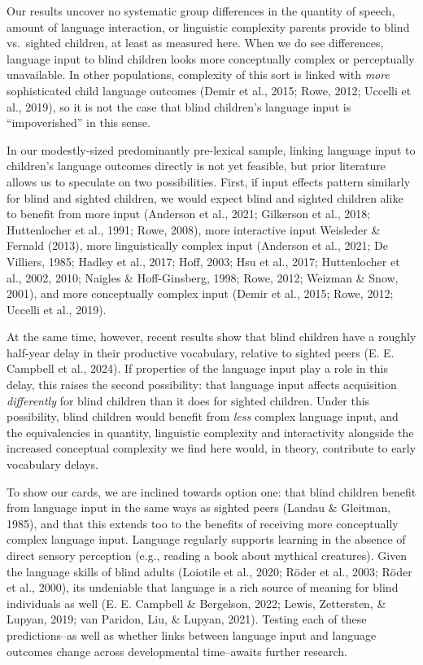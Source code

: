 \documentclass[
  man]{apa6}
\begin{document}
Our results uncover no systematic group differences in the quantity of speech, amount of language interaction, or linguistic complexity parents provide to blind vs.~sighted children, at least as measured here. When we do see differences, language input to blind children looks more conceptually complex or perceptually unavailable. In other populations, complexity of this sort is linked with \emph{more} sophisticated child language outcomes (Demir et al., 2015; Rowe, 2012; Uccelli et al., 2019), so it is not the case that blind children's language input is ``impoverished'' in this sense.

In our modestly-sized predominantly pre-lexical sample, linking language input to children's language outcomes directly is not yet feasible, but prior literature allows us to speculate on two possibilities. First, if input effects pattern similarly for blind and sighted children, we would expect blind and sighted children alike to benefit from more input (Anderson et al., 2021; Gilkerson et al., 2018; Huttenlocher et al., 1991; Rowe, 2008), more interactive input Weisleder \& Fernald (2013), more linguistically complex input (Anderson et al., 2021; De Villiers, 1985; Hadley et al., 2017; Hoff, 2003; Hsu et al., 2017; Huttenlocher et al., 2002, 2010; Naigles \& Hoff-Ginsberg, 1998; Rowe, 2012; Weizman \& Snow, 2001), and more conceptually complex input (Demir et al., 2015; Rowe, 2012; Uccelli et al., 2019).

At the same time, however, recent results show that blind children have a roughly half-year delay in their productive vocabulary, relative to sighted peers (E. E. Campbell et al., 2024). If properties of the language input play a role in this delay, this raises the second possibility: that language input affects acquisition \emph{differently} for blind children than it does for sighted children. Under this possibility, blind children would benefit from \emph{less} complex language input, and the equivalencies in quantity, linguistic complexity and interactivity alongside the increased conceptual complexity we find here would, in theory, contribute to early vocabulary delays.

To show our cards, we are inclined towards option one: that blind children benefit from language input in the same ways as sighted peers (Landau \& Gleitman, 1985), and that this extends too to the benefits of receiving more conceptually complex language input. Language regularly supports learning in the absence of direct sensory perception (e.g., reading a book about mythical creatures). Given the language skills of blind adults (Loiotile et al., 2020; Röder et al., 2003; Röder et al., 2000), its undeniable that language is a rich source of meaning for blind individuals as well (E. E. Campbell \& Bergelson, 2022; Lewis, Zettersten, \& Lupyan, 2019; van Paridon, Liu, \& Lupyan, 2021). Testing each of these predictions--as well as whether links between language input and language outcomes change across developmental time--awaits further research.
\end{document}
